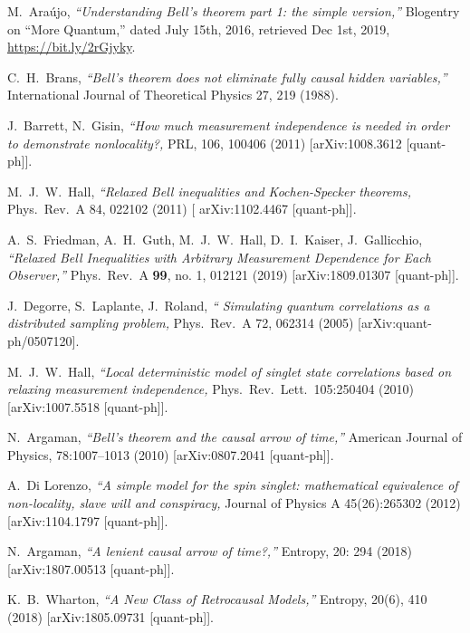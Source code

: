 \documentclass[12pt]{article}
\begin{document}
\begin{thebibliography}{99}
{ M.~Ara\'ujo, {\sl ``Understanding Bell’s theorem part 1: the simple version,''} Blogentry on ``More Quantum,''  dated July 15th, 2016, retrieved Dec 1st, 2019, {\url{https://bit.ly/2rGjyky}}.

 C.~H.~Brans, {\sl ``Bell's theorem does not eliminate fully causal hidden variables,''} International Journal of Theoretical Physics
27, 219 (1988).
}


J.~Barrett, N.~Gisin, {\sl ``How much measurement independence is needed in order to demonstrate nonlocality?,} PRL, 106, 100406 (2011) [arXiv:1008.3612 [quant-ph]].

M.~J.~W.~Hall, {\sl ``Relaxed Bell inequalities and Kochen-Specker theorems,} Phys.\ Rev.\ A 84, 022102 (2011) [	arXiv:1102.4467 [quant-ph]].
 


  A.~S.~Friedman, A.~H.~Guth, M.~J.~W.~Hall, D.~I.~Kaiser, J.~Gallicchio,
  {\sl ``Relaxed Bell Inequalities with Arbitrary Measurement Dependence for Each Observer,''}
  Phys.\ Rev.\ A {\bf 99}, no. 1, 012121 (2019)
  [arXiv:1809.01307 [quant-ph]].

J.~Degorre, S.~Laplante, J.~Roland,  {\sl ``  Simulating quantum correlations as a distributed sampling problem,} Phys.\ Rev.\ A 72, 062314 (2005) [arXiv:quant-ph/0507120].

 M.~J.~W.~Hall, {\sl ``Local deterministic model of singlet state correlations based on relaxing measurement independence,} Phys.\ Rev.\ Lett.\ 105:250404 (2010) 
[arXiv:1007.5518 [quant-ph]].

 N.~Argaman, {\sl ``Bell’s theorem and the causal arrow of time,''}
American Journal of Physics, 78:1007–1013 (2010) [arXiv:0807.2041 [quant-ph]].

A.~Di Lorenzo, {\sl ``A simple model for the spin singlet: mathematical equivalence of non-locality, slave will and conspiracy,} Journal of Physics A
45(26):265302 (2012) [arXiv:1104.1797 [quant-ph]].

 N.~Argaman, {\sl ``A lenient causal arrow of time?,''} Entropy, 20:
294 (2018) [arXiv:1807.00513 [quant-ph]].
 
 K.~B.~Wharton, {\sl ``A New Class of Retrocausal Models,''} Entropy, 20(6), 410 (2018) [arXiv:1805.09731 [quant-ph]].


\end{thebibliography}
\end{document}
